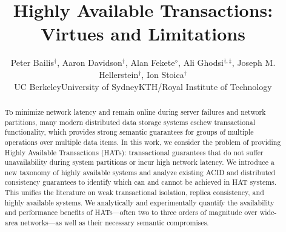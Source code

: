 \documentclass{vldb}
\newif\iftechreport
\theoremstyle{definition}
\begin{document}

\title{Highly Available Transactions: Virtues and Limitations\iftechreport\\(Extended Version)\fi}
{\author{Peter Bailis{\fontsize{12}{14}$^\dagger$}, Aaron Davidson{\fontsize{12}{14}$^\dagger$}, Alan Fekete{\fontsize{12}{14}$^\diamond$}, Ali Ghodsi{\fontsize{12}{14}$^{\dagger,\ddagger}$}, Joseph M. Hellerstein{\fontsize{12}{14}$^\dagger$}, Ion Stoica{\fontsize{12}{14}$^\dagger$}\\{\affaddr{\fontsize{12}{14}$^\dagger$}\hspace{.5mm}UC Berkeley\hspace{4mm}{\fontsize{12}{14}$^\diamond$}\hspace{.5mm}University of Sydney\hspace{4mm}{\fontsize{12}{14}$^\ddagger$}\hspace{.5mm}KTH/Royal Institute of Technology}}}
\maketitle

\begin{abstract}
\noindent To minimize network latency and remain online during server
failures and network partitions, many modern distributed data storage
systems eschew transactional functionality, which provides strong
semantic guarantees for groups of multiple operations over multiple
data items. In this work, we consider the problem of providing Highly
Available Transactions (HATs): transactional guarantees that do not
suffer unavailability during system partitions or incur high network
latency.  We introduce a new taxonomy of highly available systems and
analyze existing ACID and distributed consistency guarantees to
identify which can and cannot be achieved in HAT systems. This unifies
the literature on weak transactional isolation, replica consistency,
and highly available systems. We analytically and experimentally
quantify the availability and performance benefits of HATs---often two
to three orders of magnitude over wide-area networks---as well as
their necessary semantic compromises.
\end{abstract}








\end{document}
